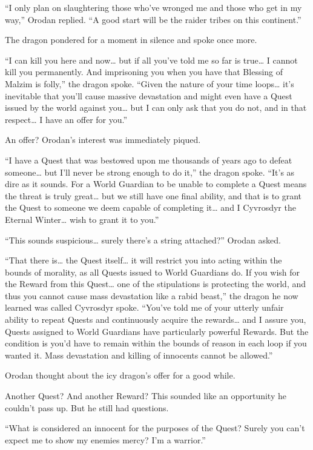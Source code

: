 \documentclass[a4paper,10pt]{book}
\begin{document}
“I only plan on slaughtering those who’ve wronged me and those who get in my way,” Orodan replied. “A good start will be the raider tribes on this continent.”\par
The dragon pondered for a moment in silence and spoke once more.\par
“I can kill you here and now… but if all you’ve told me so far is true… I cannot kill you permanently. And imprisoning you when you have that Blessing of Malzim is folly,” the dragon spoke. “Given the nature of your time loops… it’s inevitable that you’ll cause massive devastation and might even have a Quest issued by the world against you… but I can only ask that you do not, and in that respect… I have an offer for you.”\par
An offer? Orodan’s interest was immediately piqued.\par
“I have a Quest that was bestowed upon me thousands of years ago to defeat someone… but I’ll never be strong enough to do it,” the dragon spoke. “It’s as dire as it sounds. For a World Guardian to be unable to complete a Quest means the threat is truly great… but we still have one final ability, and that is to grant the Quest to someone we deem capable of completing it… and I Cyvrosdyr the Eternal Winter… wish to grant it to you.”\par
“This sounds suspicious… surely there’s a string attached?” Orodan asked.\par
“That there is… the Quest itself… it will restrict you into acting within the bounds of morality, as all Quests issued to World Guardians do. If you wish for the Reward from this Quest… one of the stipulations is protecting the world, and thus you cannot cause mass devastation like a rabid beast,” the dragon he now learned was called Cyvrosdyr spoke. “You’ve told me of your utterly unfair ability to repeat Quests and continuously acquire the rewards… and I assure you, Quests assigned to World Guardians have particularly powerful Rewards. But the condition is you’d have to remain within the bounds of reason in each loop if you wanted it. Mass devastation and killing of innocents cannot be allowed.”\par
Orodan thought about the icy dragon’s offer for a good while.\par
Another Quest? And another Reward? This sounded like an opportunity he couldn’t pass up. But he still had questions.\par
“What is considered an innocent for the purposes of the Quest? Surely you can’t expect me to show my enemies mercy? I’m a warrior.”\par
\end{document}
